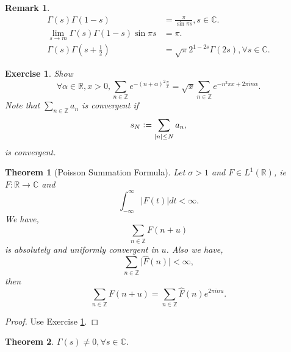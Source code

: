 \documentclass{article}
\newtheorem{theorem}{Theorem} [section]
\newtheorem{remark}{Remark}[section]
\newtheorem{exercise}{Exercise}[section]
\newcommand{\defeq}{\vcentcolon=}
\newcommand{\R}[0]{\mathbb{R}}
\newcommand{\Z}[0]{\mathbb{Z}}
\newcommand{\C}[0]{\mathbb{C}}
\begin{document}
\begin{remark}
  \begin{align*}
    \Gamma(s)\Gamma(1-s) & = {\frac {\pi} {\sin\pi s}}, s\in\C.\\
    \lim_{s\to m}\Gamma(s)\Gamma(1-s)\sin\pi s &= \pi.\\
    \Gamma(s)\Gamma\left(s+{\frac 1 2 }\right) &= \sqrt{\pi}2^{1-2s}\Gamma(2s),\forall s\in\C.
  \end{align*}
  \label{remark_gamma_poles}
\end{remark}
\begin{exercise}
  Show 
  \begin{equation*}
     \forall \alpha\in \R, x>0, \sum_{n\in\Z}e^{-(n+\alpha)^2{\frac \pi x}}=\sqrt{x}\sum_{n\in\Z}e^{-n^2\pi x+2\pi i n \alpha}.
  \end{equation*}
  Note that $\sum_{n\in\Z}a_n$ is convergent if 
  \begin{equation*}
    s_N\defeq \sum_{\vert n\vert \leq N}a_n,
  \end{equation*}
  is convergent.
  \label{exercise_fourier_poisson_summation}
\end{exercise}
\begin{theorem}[Poisson Summation Formula]
  Let $\sigma>1$ and $F\in L^1(\R)$, ie $F:\R\to\C$ and 
  \begin{equation*}
    \int_{-\infty}^\infty \vert F(t)\vert dt<\infty.
  \end{equation*}
  We have,
  \begin{equation*}
    \sum_{n\in\Z}F(n+u)
  \end{equation*}
  is absolutely and uniformly convergent in $u$. Also we have,
  \begin{equation*}
    \sum_{n\in\Z}\vert \hat{F}(n)\vert<\infty,
  \end{equation*}
  then 
  \begin{equation*}
    \sum_{n\in\Z}F(n+u) = \sum_{n\in\Z}\hat{F}(n)e^{2\pi i n u}.
  \end{equation*}
  \label{theorem_fourier_transform_convergent}
  \label{theorem_poisson_summation}
\end{theorem}
\begin{proof}
  Use Exercise \ref{exercise_fourier_poisson_summation}.
\end{proof}
\begin{theorem}
  \label{theorem_gamma_singulality}
  $\Gamma(s) \not=0,\forall s\in\C$.
\end{theorem}
\end{document}
